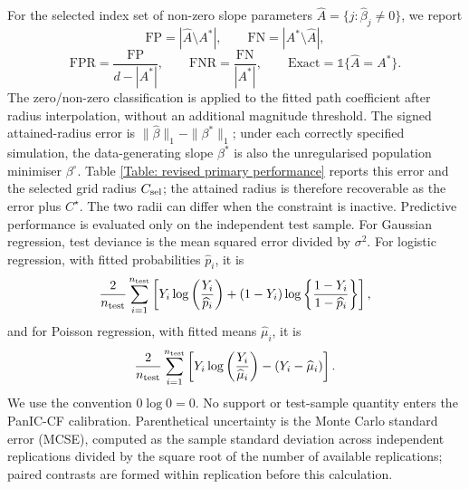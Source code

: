 \documentclass[12pt]{article}
\newenvironment{bluechange}{\begingroup\color[rgb]{0.00,0.00,1.00}}{\endgroup}
\theoremstyle{remark}
\theoremstyle{plain}
\begin{document}
\begin{bluechange}
For the selected index set of non-zero slope parameters $\widehat A=\{j:\widehat\beta_j\ne0\}$, we report
\[
\mathrm{FP}=|\widehat A\setminus A^*|,\qquad
\mathrm{FN}=|A^*\setminus\widehat A|,
\]
\[
\mathrm{FPR}=\frac{\mathrm{FP}}{d-|A^*|},\qquad
\mathrm{FNR}=\frac{\mathrm{FN}}{|A^*|},\qquad
\mathrm{Exact}=\mathds{1}\{\widehat A=A^*\}.
\]
The zero/non-zero classification is applied to the fitted path coefficient after radius interpolation, without an additional magnitude threshold. The signed attained-radius error is $\|\widehat\beta\|_1-\|\beta^*\|_1$; under each correctly specified simulation, the data-generating slope $\beta^*$ is also the unregularised population minimiser $\beta^\circ$. Table \ref{Table: revised primary performance} reports this error and the selected grid radius $C_{\rm sel}$; the attained radius is therefore recoverable as the error plus $C^\star$. The two radii can differ when the constraint is inactive. Predictive performance is evaluated only on the independent test sample. For Gaussian regression, test deviance is the mean squared error divided by $\sigma^2$. For logistic regression, with fitted probabilities $\widehat p_i$, it is
\[
\frac{2}{n_{\rm test}}\sum_{i=1}^{n_{\rm test}}
\left[
Y_i\log\left(\frac{Y_i}{\widehat p_i}\right)
+(1-Y_i)\log\left\{\frac{1-Y_i}{1-\widehat p_i}\right\}
\right],
\]
and for Poisson regression, with fitted means $\widehat\mu_i$, it is
\[
\frac{2}{n_{\rm test}}\sum_{i=1}^{n_{\rm test}}
\left[
Y_i\log\left(\frac{Y_i}{\widehat\mu_i}\right)-(Y_i-\widehat\mu_i)
\right].
\]
We use the convention $0\log0=0$. No support or test-sample quantity enters the PanIC-CF calibration. Parenthetical uncertainty is the Monte Carlo standard error (MCSE), computed as the sample standard deviation across independent replications divided by the square root of the number of available replications; paired contrasts are formed within replication before this calculation.


\end{bluechange}
\end{document}

